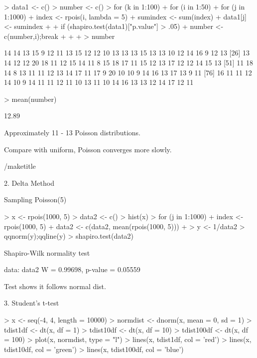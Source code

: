 \begin{Schunk}
\begin{Sinput}
> data1 <- c()
> number <- c()
> for (k in 1:100) {
+   for (i in 1:50) {
+     for (j in 1:1000) {
+       index <- rpois(i, lambda = 5)
+       sumindex <- sum(index)
+       data1[j] <- sumindex
+     }
+     if (shapiro.test(data1)["p.value"] > .05) {
+       number <- c(number,i);break
+     }
+   }
+ }
> number
\end{Sinput}
\begin{Soutput}
  [1] 14 14 13 15  9 12 11 13 15 12 12 10 13 13 13 15 13 13 10 12 14 16  9 12 13
 [26] 13 14 12 12 20 18 11 12 15 14 11  8 15 18 17 11 15 12 13 17 12 12 14 15 13
 [51] 11 18 14  8 13 11 11 12 13 14 17 11 17  9 20 10 10  9 14 16 13 17 13  9 11
 [76] 16 11 11 12 14 10  9 14 11 11 12 11 10 13 11 10 14 16 13 13 12 14 17 12 11
\end{Soutput}
\begin{Sinput}
> mean(number)
\end{Sinput}
\begin{Soutput}
[1] 12.89
\end{Soutput}
\end{Schunk}

Approximately 11 - 13 Poisson distributions.

Compare with uniform, Poisson converges more slowly.

/maketitle{}

2. Delta Method

Sampling Poisson(5)

\begin{Schunk}
\begin{Sinput}
> x <- rpois(1000, 5)
> data2 <- c()
> hist(x)
> for (j in 1:1000) {
+   index <- rpois(1000, 5)
+   data2 <- c(data2, mean(rpois(1000, 5)))
+   }
> y <- 1/data2
> qqnorm(y);qqline(y)
> shapiro.test(data2)
\end{Sinput}
\begin{Soutput}
	Shapiro-Wilk normality test

data:  data2
W = 0.99698, p-value = 0.05559
\end{Soutput}
\end{Schunk}

Test shows it follows normal dist.

3. Student's t-test

\begin{Schunk}
\begin{Sinput}
> x <- seq(-4, 4, length = 10000)
> normdist <- dnorm(x, mean = 0, sd = 1)
> tdist1df <- dt(x, df = 1)
> tdist10df <- dt(x, df = 10)
> tdist100df <- dt(x, df = 100)
> plot(x, normdist, type = "l")
> lines(x, tdist1df, col = 'red')
> lines(x, tdist10df, col = 'green')
> lines(x, tdist100df, col = 'blue')
\end{Sinput}
\end{Schunk}

